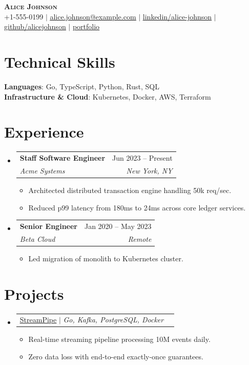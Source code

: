 \documentclass[letterpaper,11pt]{article}
\makeatletter
\newcommand{\resumeItem}[1]{
  \item\small{
    {#1 \vspace{-2pt}}
  }
}
\newcommand{\resumeSubheading}[4]{
  \vspace{-2pt}\item
    \begin{tabular*}{0.97\textwidth}[t]{l@{\extracolsep{\fill}}r}
      \textbf{#1} & #2 \\
      \textit{\small#3} & \textit{\small #4} \\
    \end{tabular*}\vspace{-7pt}
}
\newcommand{\resumeProjectHeading}[2]{
    \vspace{-2pt}\item
    \begin{tabular*}{0.97\textwidth}{l@{\extracolsep{\fill}}r}
      \small#1 & #2 \\
    \end{tabular*}\vspace{-7pt}
}
\newcommand{\resumeSubHeadingListStart}{\begin{itemize}[leftmargin=0.15in, label={}]}
\newcommand{\resumeSubHeadingListEnd}{\end{itemize}}
\newcommand{\resumeItemListStart}{\begin{itemize}}
\newcommand{\resumeItemListEnd}{\end{itemize}\vspace{-2pt}}
\makeatother
\begin{document}
\begin{center}
    \textbf{\Huge \scshape Alice Johnson} \\ \vspace{1pt}
    \small +1-555-0199 $|$ \href{mailto:alice.johnson@example.com}{\underline{alice.johnson@example.com}} $|$ \href{https://linkedin.com/in/alice-johnson}{\underline{linkedin/alice-johnson}} $|$ \href{https://github.com/alicejohnson}{\underline{github/alicejohnson}} $|$ \href{https://alice.dev}{\underline{portfolio}}
\end{center}

\section{Technical Skills}
 \begin{itemize}[leftmargin=0.15in, label={}]
    \small{\item{
     \textbf{Languages}{: Go, TypeScript, Python, Rust, SQL} \\
     \textbf{Infrastructure \& Cloud}{: Kubernetes, Docker, AWS, Terraform}
    }}
 \end{itemize}

\section{Experience}
  \resumeSubHeadingListStart
    \resumeSubheading
      {Staff Software Engineer}{Jun 2023 -- Present}
      {Acme Systems}{New York, NY}
      \resumeItemListStart
        \resumeItem{Architected distributed transaction engine handling 50k req/sec.}
        \resumeItem{Reduced p99 latency from 180ms to 24ms across core ledger services.}
      \resumeItemListEnd
    \resumeSubheading
      {Senior Engineer}{Jan 2020 -- May 2023}
      {Beta Cloud}{Remote}
      \resumeItemListStart
        \resumeItem{Led migration of monolith to Kubernetes cluster.}
      \resumeItemListEnd
  \resumeSubHeadingListEnd

\section{Projects}
  \resumeSubHeadingListStart
    \resumeProjectHeading
      {\href{https://github.com/alicejohnson/streampipe}{\underline{StreamPipe}} $|$ \emph{Go, Kafka, PostgreSQL, Docker}}{}
      \resumeItemListStart
        \resumeItem{Real-time streaming pipeline processing 10M events daily.}
        \resumeItem{Zero data loss with end-to-end exactly-once guarantees.}
      \resumeItemListEnd
  \resumeSubHeadingListEnd
\end{document}
